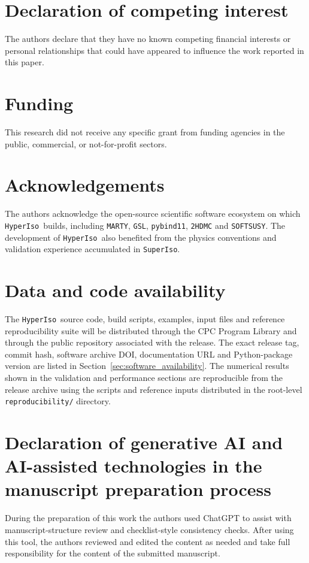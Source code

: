 \documentclass[preprint,11pt]{elsarticle}
\newcommand{\hi}{\texttt{HyperIso}}
\newcommand{\spi}{\texttt{SuperIso}}
\newcommand{\mty}{\texttt{MARTY}}
\begin{document}
\section*{Declaration of competing interest}
The authors declare that they have no known competing financial interests or personal relationships that could have appeared to influence the work reported in this paper.

\section*{Funding}
This research did not receive any specific grant from funding agencies in the public, commercial, or not-for-profit sectors.

\section*{Acknowledgements}
The authors acknowledge the open-source scientific software ecosystem on which \hi~builds, including \mty, \texttt{GSL}, \texttt{pybind11}, \texttt{2HDMC} and \texttt{SOFTSUSY}.  The development of \hi~also benefited from the physics conventions and validation experience accumulated in \spi.

\section*{Data and code availability}
The \hi~source code, build scripts, examples, input files and reference reproducibility suite will be distributed through the CPC Program Library and through the public repository associated with the release.  The exact release tag, commit hash, software archive DOI, documentation URL and Python-package version are listed in Section~\ref{sec:software_availability}.  The numerical results shown in the validation and performance sections are reproducible from the release archive using the scripts and reference inputs distributed in the root-level \texttt{reproducibility/} directory.

\section*{Declaration of generative AI and AI-assisted technologies in the manuscript preparation process}
During the preparation of this work the authors used ChatGPT to assist with manuscript-structure review and checklist-style consistency checks.  After using this tool, the authors reviewed and edited the content as needed and take full responsibility for the content of the submitted manuscript.
\end{document}
